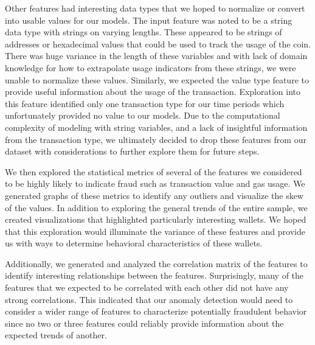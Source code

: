 \documentclass[sigconf]{acmart}
\begin{document}
Other features had interesting data types that we hoped to normalize or convert into usable values for our models. The input feature was noted to be a string data type with strings on varying lengths. These appeared to be strings of addresses or hexadecimal values that could be used to track the usage of the coin. There was huge variance in the length of these variables and with lack of domain knowledge for how to extrapolate usage indicators from these strings, we were unable to normalize these values. Similarly, we expected the value type feature to provide useful information about the usage of the transaction. Exploration into this feature identified only one transaction type for our time periods which unfortunately provided no value to our models. Due to the computational complexity of modeling with string variables, and a lack of insightful information from the transaction type, we ultimately decided to drop these features from our dataset with considerations to further explore them for future steps. 

We then explored the statistical metrics of several of the features we considered to be highly likely to indicate fraud such as transaction value and gas usage. We generated graphs of these metrics to identify any outliers and visualize the skew of the values. In addition to exploring the general trends of the entire sample, we created visualizations that highlighted particularly interesting wallets. We hoped that this exploration would illuminate the variance of these features and provide us with ways to determine behavioral characteristics of these wallets.   

Additionally, we generated and analyzed the correlation matrix of the features to identify interesting relationships between the features. Surprisingly, many of the features that we expected to be correlated with each other did not have any strong correlations. This indicated that our anomaly detection would need to consider a wider range of features to characterize potentially fraudulent behavior since no two or three features could reliably provide information about the expected trends of another. 
\end{document}
